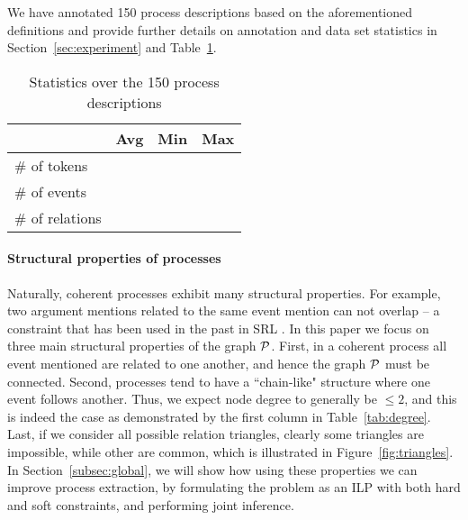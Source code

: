 We have annotated 150 process descriptions based on the aforementioned definitions and provide further details on annotation and data set statistics in Section~\ref{sec:experiment} and Table~\ref{tab:datastats}.

\begin{table}[t]
{\small
\hfill{}
\begin{tabular}{|l|r|r|r|}
\hline
&\textbf{Avg}&\textbf{Min} & \textbf{Max}\\
\hline
\# of tokens            &            &           &   \\ 
\# of events                &           &          &    \\ 
\# of relations          &            &              & \\ 
\hline
\end{tabular}}
\hfill{}
\caption{Statistics over the 150 process descriptions}
\label{tab:datastats}
\end{table}

\paragraph{Structural properties of processes} 
Naturally, coherent processes exhibit many structural properties. For example, two argument mentions related to the same event mention can not overlap -- a constraint that has been used in the past in SRL \cite{Toutanova08}. In this paper we focus on three main structural properties of the graph $\mathcal{P}$. First, in a coherent process all event mentioned are related to one another, and hence the graph $\mathcal{P}$ must be connected. Second, processes tend to have a ``chain-like" structure where one event follows another. Thus, we expect node degree to generally be $\leq 2$, and this is indeed the case as demonstrated by the first column in Table~\ref{tab:degree}. Last, if we consider all possible relation triangles, clearly some triangles are impossible, while other are common, which is illustrated in Figure~\ref{fig:triangles}. In Section~\ref{subsec:global}, we will show how using these properties we can improve process extraction, by formulating the problem as an ILP with both hard and soft constraints, and performing joint inference.


